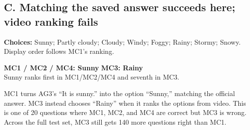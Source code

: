 \documentclass[11pt,letterpaper]{article}
\begin{document}
\subsection*{C. Matching the saved answer succeeds here; video ranking fails}
{\small\textbf{Choices:} Sunny; Partly cloudy; Cloudy; Windy; Foggy; Rainy; Stormy; Snowy. Display order follows MC1's ranking.}
\begin{center}\small
\textcolor{decisiongreen}{\textbf{MC1 / MC2 / MC4: Sunny}}\qquad
\textcolor{reviewamber}{\textbf{MC3: Rainy}}\\[3pt]
Sunny ranks first in MC1/MC2/MC4 and seventh in MC3.
\end{center}
MC1 turns AG3's ``It is sunny.'' into the option ``Sunny,'' matching the official answer. MC3 instead chooses ``Rainy'' when it ranks the options from video. This is one of 20 questions where MC1, MC2, and MC4 are correct but MC3 is wrong. Across the full test set, MC3 still gets 140 more questions right than MC1.

\clearpage
\end{document}
